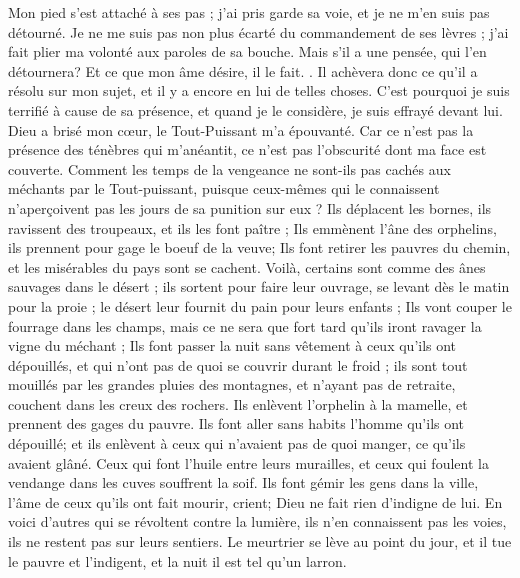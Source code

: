\begin{multicols}{2}
Mon pied s'est attaché à ses pas ; j'ai pris garde sa voie, et je ne m'en suis pas détourné.
Je ne me suis pas non plus écarté du commandement de ses lèvres ; j'ai fait plier ma volonté aux paroles de sa bouche.
Mais s'il a une pensée, qui l'en détournera? Et ce que mon âme désire, il le fait.
.
Il achèvera donc ce qu'il a résolu sur mon sujet, et il y a encore en lui de telles choses.
C'est pourquoi je suis terrifié à cause de sa présence, et quand je le considère, je suis effrayé devant lui.
Dieu a brisé mon cœur, le Tout-Puissant m'a épouvanté.
Car ce n'est pas la présence des ténèbres qui m'anéantit, ce n'est pas l'obscurité dont ma face est couverte.
\VerseOne{}Comment les temps de la vengeance ne sont-ils pas cachés aux méchants par le Tout-puissant, puisque ceux-mêmes qui le connaissent n'aperçoivent pas les jours de sa punition sur eux ?
Ils déplacent les bornes, ils ravissent des troupeaux, et ils les font paître ;
Ils emmènent l'âne des orphelins, ils prennent pour gage le boeuf de la veuve;
Ils font retirer les pauvres du chemin, et les misérables du pays sont se cachent.
Voilà, certains sont comme des ânes sauvages dans le désert ; ils sortent pour faire leur ouvrage, se levant dès le matin pour la proie ; le désert leur fournit du pain pour leurs enfants ;
Ils vont couper le fourrage dans les champs, mais ce ne sera que fort tard qu'ils iront ravager la vigne du méchant ; 
Ils font passer la nuit sans vêtement à ceux qu'ils ont dépouillés, et qui n'ont pas de quoi se couvrir durant le froid  ;
ils sont tout mouillés par les grandes pluies des montagnes, et n'ayant pas de retraite, couchent dans les creux des rochers. 
Ils enlèvent l'orphelin à la mamelle, et prennent des gages du pauvre. 
Ils font aller sans habits l'homme qu'ils ont dépouillé; et ils enlèvent à ceux qui n'avaient pas de quoi manger, ce qu'ils avaient glâné.
Ceux qui font l'huile entre leurs murailles, et ceux qui foulent la vendange dans les cuves souffrent la soif.
Ils font gémir les gens dans la ville, l'âme de ceux qu'ils ont fait mourir, crient; Dieu ne fait rien d'indigne de lui.
En voici d'autres qui se révoltent contre la lumière, ils n'en connaissent pas les voies, ils ne restent pas sur leurs sentiers.
Le meurtrier se lève au point du jour, et il tue le pauvre et l'indigent, et la nuit il est tel qu'un larron.

\end{multicols}
